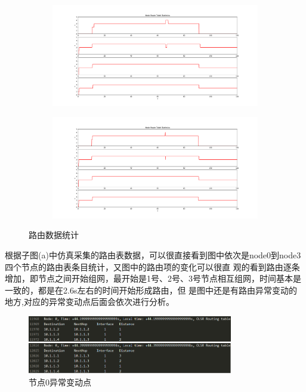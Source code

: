 \documentclass[a4paper,12pt]{report}
\begin{document}
\begin{spacing}{1.5}
\begin{figure}[hbtp]
\begin{subfigure}[t]{0.4\textwidth}
\centering
	\includegraphics [width=1\textwidth]{figure//route3.pdf}
\end{subfigure}
\quad
\begin{subfigure}[t]{0.4\textwidth}
\centering
	\includegraphics [width=1\textwidth]{figure//route4.pdf}
\end{subfigure}
\caption{路由数据统计}\label{figure1}
\end{figure}


根据子图(a)中仿真采集的路由表数据，可以很直接看到图中依次是node0到node3四个节点的路由表条目统计，又图中的路由项的变化可以很直
观的看到路由逐条增加，即节点之间开始组网，最开始是1号、2号、3号节点相互组网，时间基本是一致的，都是在2.6s左右的时间开始形成路由，但
是图中还是有路由异常变动的地方,对应的异常变动点后面会依次进行分析。

\begin{figure}[hbtp]
	\centering
	\includegraphics [width=0.8\textwidth]{figure//0-1.png}
	\caption{节点0异常变动点}\label{node0}
\end{figure}



\end{spacing}
\end{document}
